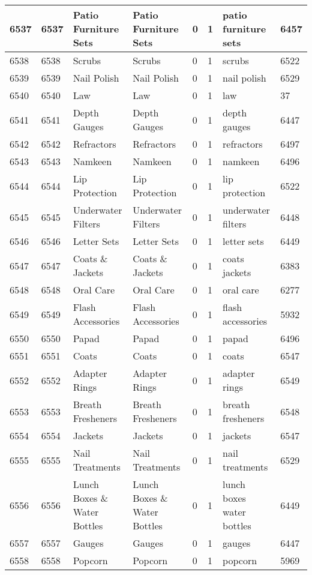\begin{longtable}{|l|l|l|l|l|l|l|l|}
6537 & 6537 & Patio Furniture Sets & Patio Furniture Sets & 0 & 1 & patio furniture sets & 6457 \\ \hline 
6538 & 6538 & Scrubs & Scrubs & 0 & 1 & scrubs & 6522 \\ \hline 
6539 & 6539 & Nail Polish & Nail Polish & 0 & 1 & nail polish & 6529 \\ \hline 
6540 & 6540 & Law & Law & 0 & 1 & law & 37 \\ \hline 
6541 & 6541 & Depth Gauges & Depth Gauges & 0 & 1 & depth gauges & 6447 \\ \hline 
6542 & 6542 & Refractors & Refractors & 0 & 1 & refractors & 6497 \\ \hline 
6543 & 6543 & Namkeen & Namkeen & 0 & 1 & namkeen & 6496 \\ \hline 
6544 & 6544 & Lip Protection & Lip Protection & 0 & 1 & lip protection & 6522 \\ \hline 
6545 & 6545 & Underwater Filters & Underwater Filters & 0 & 1 & underwater filters & 6448 \\ \hline 
6546 & 6546 & Letter Sets & Letter Sets & 0 & 1 & letter sets & 6449 \\ \hline 
6547 & 6547 & Coats \& Jackets & Coats \& Jackets & 0 & 1 & coats jackets & 6383 \\ \hline 
6548 & 6548 & Oral Care & Oral Care & 0 & 1 & oral care & 6277 \\ \hline 
6549 & 6549 & Flash Accessories & Flash Accessories & 0 & 1 & flash accessories & 5932 \\ \hline 
6550 & 6550 & Papad & Papad & 0 & 1 & papad & 6496 \\ \hline 
6551 & 6551 & Coats & Coats & 0 & 1 & coats & 6547 \\ \hline 
6552 & 6552 & Adapter Rings & Adapter Rings & 0 & 1 & adapter rings & 6549 \\ \hline 
6553 & 6553 & Breath Fresheners & Breath Fresheners & 0 & 1 & breath fresheners & 6548 \\ \hline 
6554 & 6554 & Jackets & Jackets & 0 & 1 & jackets & 6547 \\ \hline 
6555 & 6555 & Nail Treatments & Nail Treatments & 0 & 1 & nail treatments & 6529 \\ \hline 
6556 & 6556 & Lunch Boxes \& Water Bottles & Lunch Boxes \& Water Bottles & 0 & 1 & lunch boxes water bottles & 6449 \\ \hline 
6557 & 6557 & Gauges & Gauges & 0 & 1 & gauges & 6447 \\ \hline 
6558 & 6558 & Popcorn & Popcorn & 0 & 1 & popcorn & 5969 \\ \hline 

\end{longtable}
